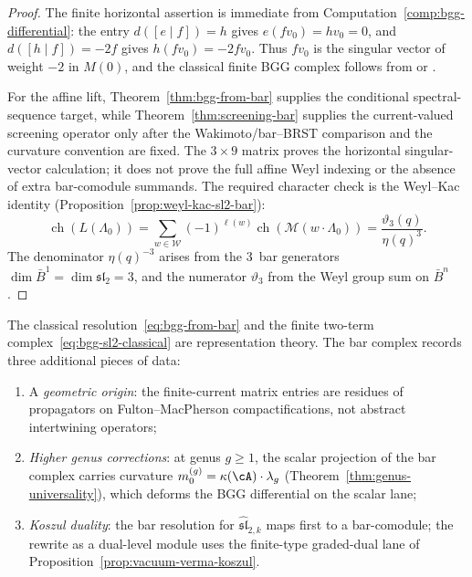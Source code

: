 \begin{proof}
The finite horizontal assertion is immediate from
Computation~\ref{comp:bgg-differential}: the entry
$d([e\mid f])=h$ gives
$e(fv_0)=h v_0=0$, and $d([h\mid f])=-2f$ gives
$h(fv_0)=-2fv_0$. Thus $fv_0$ is the singular vector of weight
$-2$ in $M(0)$, and the classical finite BGG complex follows from
\cite{BGG76} or \cite[\S10.7]{Kac}.

For the affine lift, Theorem~\ref{thm:bgg-from-bar} supplies the
conditional spectral-sequence target, while
Theorem~\ref{thm:screening-bar} supplies the current-valued
screening operator only after the Wakimoto/bar--BRST comparison and
the curvature convention are fixed. The $3\times9$ matrix proves the
horizontal singular-vector calculation; it does not prove the full
affine Weyl indexing or the absence of extra bar-comodule summands.
The required character check is the Weyl--Kac identity
(Proposition~\ref{prop:weyl-kac-sl2-bar}):
\[
\operatorname{ch}(L(\Lambda_0))
= \sum_{w \in \mathcal{W}} (-1)^{\ell(w)}
 \operatorname{ch}(\mathcal{M}(w \cdot \Lambda_0))
= \frac{\vartheta_3(q)}{\eta(q)^3}.
\]
The denominator $\eta(q)^{-3}$ arises from the 3~bar generators
$\dim \bar{B}^1 = \dim \mathfrak{sl}_2 = 3$, and the numerator
$\vartheta_3$ from the Weyl group sum on $\bar{B}^n$.
\end{proof}

\begin{remark}
\label{rem:bar-adds-to-bgg}
The classical resolution~\eqref{eq:bgg-from-bar} and the finite
two-term complex~\eqref{eq:bgg-sl2-classical} are representation
theory. The bar complex records three additional pieces of data:
\begin{enumerate}[label=\textup{(\alph*)}]
\item A \emph{geometric origin}: the finite-current matrix entries are residues
 of propagators on Fulton--MacPherson compactifications, not
 abstract intertwining operators;
\item \emph{Higher genus corrections}: at genus $g \geq 1$, the scalar
 projection of the bar complex carries curvature
 $m_0^{(g)} = \kappa(\cA) \cdot \lambda_g$ (Theorem~\ref{thm:genus-universality}), which deforms the BGG
 differential on the scalar lane;
\item \emph{Koszul duality}: the bar resolution for
 $\widehat{\mathfrak{sl}}_{2,k}$ maps first to a bar-comodule; the
 rewrite as a dual-level module uses the finite-type graded-dual lane
 of Proposition~\ref{prop:vacuum-verma-koszul}.
\end{enumerate}
\end{remark}


